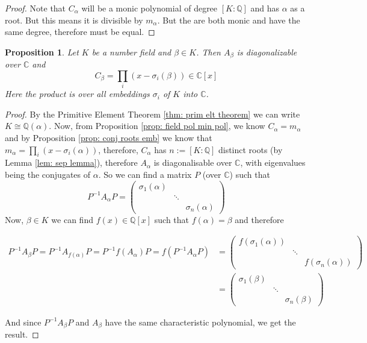 \documentclass[11pt,a4paper]{report}
\theoremstyle{plain}
\newtheorem{prop}[subsection]{Proposition}
\theoremstyle{definition}
\theoremstyle{definition}
\def\CC{\mathbb{C}}
\def\QQ{\mathbb{Q}}
\def \a{\alpha}
\begin{document}
	\begin{proof}
		Note that $C_\a$ will be a monic polynomial of degree $[K:\QQ]$ and has $\a$ as a root. But this means it is divisible by $m_\a$.  But the are both monic and have the same degree, therefore must be equal.
	\end{proof}
	
	
	
	\begin{prop}\label{prop: field poly embs}
		Let $K$ be a number field and $\beta \in K$. Then $A_\beta$ is diagonalizable over $\CC$ and \[C_\beta=\prod_{i} (x-\sigma_i(\beta)) \in \CC[x] \] Here the product is over all embeddings $\sigma_i$ of $K$ into $\CC$. 
	\end{prop}
	
	\begin{proof}
		By the Primitive Element Theorem \ref{thm: prim elt theorem} we can write $K \cong \QQ(\a)$. Now, from Proposition \ref{prop: field pol min pol}, we know $C_\a=m_\a$ and by Proposition \ref{prop: conj roots emb} we know that $m_\a=\prod_{i}(x-\sigma_i(\a))$, therefore, $C_\a$ has $n:=[K:\QQ]$ distinct roots (by Lemma \ref{lem: sep lemma}), therefore $A_\a$ is diagonalisable over $\CC$, with eigenvalues being the conjugates of $\a$. So we can find a matrix $P$ (over $\CC$) such that \[P^{-1}A_\a P= \left (\begin{matrix}\sigma_1(\a) && \\ & \ddots & \\ && \sigma_n(\a)
		\end{matrix} \right )\]
		Now, $\beta \in K$ we can find $f(x) \in \QQ[x]$ such that $f(\a)=\beta$ and therefore 
		
		\begin{align*}
			P^{-1} A_\beta P=P^{-1} A_{f(\a)} P= P^{-1} f(A_\a) P=f(P^{-1} A_\a P)&= \left (\begin{matrix}f(\sigma_1(\a)) && \\ & \ddots & \\ && f(\sigma_n(\a))
			\end{matrix} \right )\\&= \left (\begin{matrix}\sigma_1(\beta) && \\ & \ddots & \\ && \sigma_n(\beta)
			\end{matrix} \right ) 
		\end{align*}
		
		And since $P^{-1}A_\beta P$ and $A_\beta$ have the same characteristic polynomial, we get the result.
	\end{proof}
	
\end{document}
